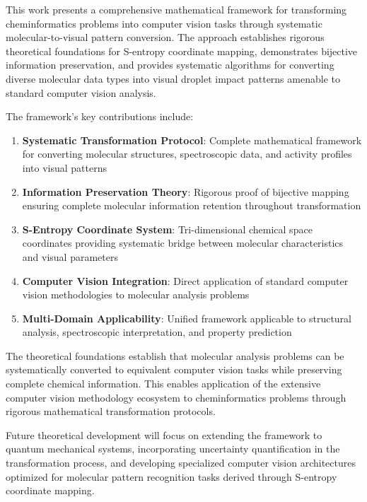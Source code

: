 \documentclass[12pt,a4paper]{article}
\begin{document}
This work presents a comprehensive mathematical framework for transforming cheminformatics problems into computer vision tasks through systematic molecular-to-visual pattern conversion. The approach establishes rigorous theoretical foundations for S-entropy coordinate mapping, demonstrates bijective information preservation, and provides systematic algorithms for converting diverse molecular data types into visual droplet impact patterns amenable to standard computer vision analysis.

The framework's key contributions include:

\begin{enumerate}
\item \textbf{Systematic Transformation Protocol}: Complete mathematical framework for converting molecular structures, spectroscopic data, and activity profiles into visual patterns
\item \textbf{Information Preservation Theory}: Rigorous proof of bijective mapping ensuring complete molecular information retention throughout transformation
\item \textbf{S-Entropy Coordinate System}: Tri-dimensional chemical space coordinates providing systematic bridge between molecular characteristics and visual parameters
\item \textbf{Computer Vision Integration}: Direct application of standard computer vision methodologies to molecular analysis problems
\item \textbf{Multi-Domain Applicability}: Unified framework applicable to structural analysis, spectroscopic interpretation, and property prediction
\end{enumerate}

The theoretical foundations establish that molecular analysis problems can be systematically converted to equivalent computer vision tasks while preserving complete chemical information. This enables application of the extensive computer vision methodology ecosystem to cheminformatics problems through rigorous mathematical transformation protocols.

Future theoretical development will focus on extending the framework to quantum mechanical systems, incorporating uncertainty quantification in the transformation process, and developing specialized computer vision architectures optimized for molecular pattern recognition tasks derived through S-entropy coordinate mapping.
\end{document}
